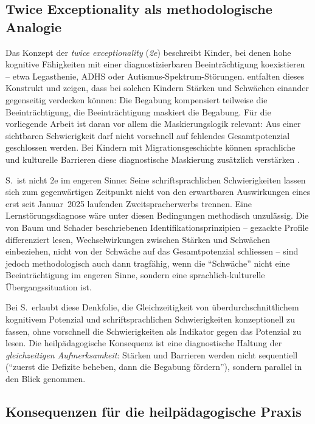 \documentclass[ngerman, a4paper]{article}
\begin{document}
\subsection{Twice Exceptionality als methodologische Analogie}
\label{subsec:2e}

Das Konzept der \textit{twice exceptionality} (\textit{2e}) beschreibt
Kinder, bei denen hohe kognitive Fähigkeiten mit einer diagnostizierbaren
Beeinträchtigung koexistieren -- etwa Legasthenie, ADHS oder
Autismus-Spektrum-Störungen.
\textcite[S.\,588--598]{baumschader2021twice} entfalten dieses Konstrukt
und zeigen, dass bei solchen Kindern Stärken und Schwächen einander
gegenseitig verdecken können: Die Begabung kompensiert teilweise die
Beeinträchtigung, die Beeinträchtigung maskiert die Begabung.
Für die vorliegende Arbeit ist daran vor allem die Maskierungslogik
relevant: Aus einer sichtbaren Schwierigkeit darf nicht vorschnell auf
fehlendes Gesamtpotenzial geschlossen werden. Bei Kindern mit
Migrationsgeschichte können sprachliche und kulturelle Barrieren diese
diagnostische Maskierung zusätzlich verstärken
\parencite[S.\,576--585]{stamm2021fehlenderblick}.

S.\ ist nicht 2e im engeren Sinne: Seine schriftsprachlichen
Schwierigkeiten lassen sich zum gegenwärtigen Zeitpunkt nicht von den
erwartbaren Auswirkungen eines erst seit Januar~2025 laufenden
Zweitspracherwerbs trennen. Eine Lernstörungsdiagnose wäre unter diesen
Bedingungen methodisch unzulässig. Die von Baum und Schader beschriebenen
Identifikationsprinzipien -- gezackte Profile differenziert lesen,
Wechselwirkungen zwischen Stärken und Schwächen einbeziehen, nicht von der
Schwäche auf das Gesamtpotenzial schliessen -- sind jedoch methodologisch
auch dann tragfähig, wenn die \enquote{Schwäche} nicht eine
Beeinträchtigung im engeren Sinne, sondern eine sprachlich-kulturelle
Übergangssituation ist.

Bei S.\ erlaubt diese Denkfolie, die Gleichzeitigkeit von
überdurchschnittlichem kognitivem Potenzial und schriftsprachlichen
Schwierigkeiten konzeptionell zu fassen, ohne vorschnell die Schwierigkeiten
als Indikator gegen das Potenzial zu lesen. Die heilpädagogische Konsequenz
ist eine diagnostische Haltung der \textit{gleichzeitigen Aufmerksamkeit}:
Stärken und Barrieren werden nicht sequentiell (\enquote{zuerst die Defizite
  beheben, dann die Begabung fördern}), sondern parallel in den Blick
genommen.

\subsection{Konsequenzen für die heilpädagogische Praxis}
\end{document}
